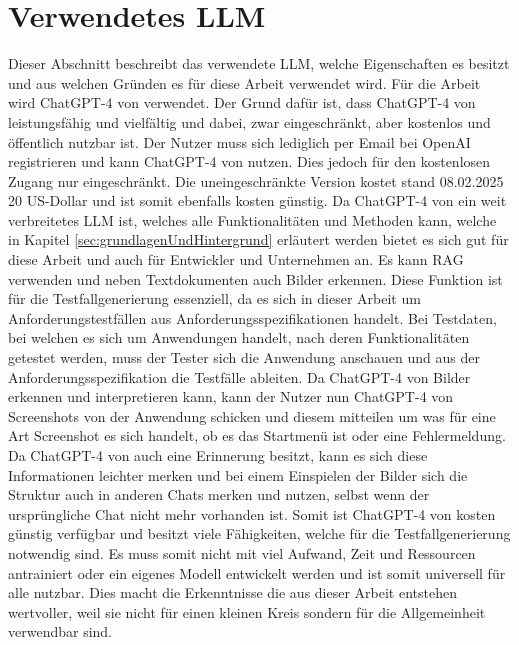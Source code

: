 \documentclass[12pt,toc=bib,toc=listof]{scrreprt}
\begin{document}
\section{Verwendetes LLM} %
\label{sec:verwendetesLLM}
Dieser Abschnitt beschreibt das verwendete LLM, welche Eigenschaften es besitzt und aus welchen Gründen es für diese Arbeit verwendet wird. Für die Arbeit wird ChatGPT-4 von \textcite{OpenAI2025} verwendet. Der Grund dafür ist, dass ChatGPT-4 von \textcite{OpenAI2025} leistungsfähig und vielfältig und dabei, zwar eingeschränkt, aber kostenlos und öffentlich nutzbar ist. Der Nutzer muss sich lediglich per Email bei OpenAI registrieren und kann ChatGPT-4 von \textcite{OpenAI2025} nutzen. Dies jedoch für den kostenlosen Zugang nur eingeschränkt. Die uneingeschränkte Version kostet stand 08.02.2025 20 US-Dollar und ist somit ebenfalls kosten günstig. Da ChatGPT-4 von \textcite{OpenAI2025} ein weit verbreitetes LLM ist, welches alle Funktionalitäten und Methoden kann, welche in Kapitel \ref{sec:grundlagenUndHintergrund} erläutert werden bietet es sich gut für diese Arbeit und auch für Entwickler und Unternehmen an. Es kann RAG verwenden und neben Textdokumenten auch Bilder erkennen. Diese Funktion ist für die Testfallgenerierung essenziell, da es sich in dieser Arbeit um Anforderungstestfällen aus Anforderungsspezifikationen handelt. Bei Testdaten, bei welchen es sich um Anwendungen handelt, nach deren Funktionalitäten getestet werden, muss der Tester sich die Anwendung anschauen und aus der Anforderungsspezifikation die Testfälle ableiten. Da ChatGPT-4 von \textcite{OpenAI2025} Bilder erkennen und interpretieren kann, kann der Nutzer nun ChatGPT-4 von \textcite{OpenAI2025} Screenshots von der Anwendung schicken und diesem mitteilen um was für eine Art Screenshot es sich handelt, ob es das Startmenü ist oder eine Fehlermeldung. Da ChatGPT-4 von \textcite{OpenAI2025} auch eine Erinnerung besitzt, kann es sich diese Informationen leichter merken und bei einem Einspielen der Bilder sich die Struktur auch in anderen Chats merken und nutzen, selbst wenn der ursprüngliche Chat nicht mehr vorhanden ist. Somit ist ChatGPT-4 von \textcite{OpenAI2025} kosten günstig verfügbar und besitzt viele Fähigkeiten, welche für die Testfallgenerierung notwendig sind. Es muss somit nicht mit viel Aufwand, Zeit und Ressourcen antrainiert oder ein eigenes Modell entwickelt werden und ist somit universell für alle nutzbar. Dies macht die Erkenntnisse die aus dieser Arbeit entstehen wertvoller, weil sie nicht für einen kleinen Kreis sondern für die Allgemeinheit verwendbar sind.
\newpage
\end{document}
